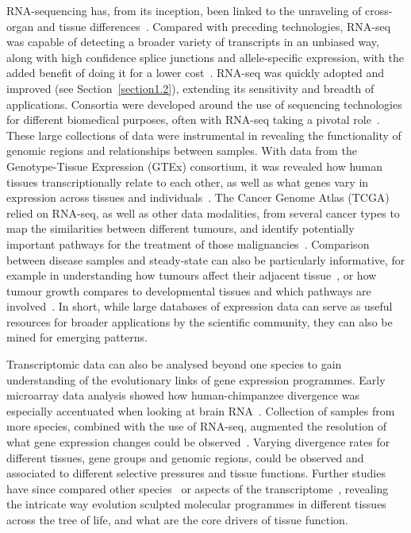 RNA-sequencing has, from its inception, been linked to the unraveling of cross-organ and tissue differences~\citep{mortazavi_mapping_2008}. Compared with preceding technologies, RNA-seq was capable of detecting a broader variety of transcripts in an unbiased way, along with high confidence splice junctions and allele-specific expression, with the added benefit of doing it for a lower cost~\citep{wang_rna-seq:_2009}. RNA-seq was quickly adopted and improved (see Section~\ref{section1.2}), extending its sensitivity and breadth of applications. Consortia were developed around the use of sequencing technologies for different biomedical purposes, often with RNA-seq taking a pivotal role~\citep{the_cancer_genome_atlas_research_network_cancer_2013,the_encode_project_consortium_integrated_2012,lonsdale_genotype-tissue_2013}. These large collections of data were instrumental in revealing the functionality of genomic regions and relationships between samples. With data from the Genotype-Tissue Expression (GTEx) consortium, it was revealed how human tissues transcriptionally relate to each other, as well as what genes vary in expression across tissues and individuals~\citep{mele_human_2015}. The Cancer Genome Atlas (TCGA) relied on RNA-seq, as well as other data modalities, from several cancer types to map the similarities between different tumours, and identify potentially important pathways for the treatment of those malignancies~\citep{hoadley_cell--origin_2018}. Comparison between disease samples and steady-state can also be particularly informative, for example in understanding how tumours affect their adjacent tissue~\citep{aran_comprehensive_2017}, or how tumour growth compares to developmental tissues and which pathways are involved~\citep{young_single-cell_2018}. In short, while large databases of expression data can serve as useful resources for broader applications by the scientific community, they can also be mined for emerging patterns.

Transcriptomic data can also be analysed beyond one species to gain understanding of the evolutionary links of gene expression programmes. Early microarray data analysis showed how human-chimpanzee divergence was especially accentuated when looking at brain RNA~\citep{enard_intra-_2002}. Collection of samples from more species, combined with the use of RNA-seq, augmented the resolution of what gene expression changes could be observed~\citep{brawand_evolution_2011}. Varying divergence rates for different tissues, gene groups and genomic regions, could be observed and associated to different selective pressures and tissue functions. Further studies have since compared other species~\citep{li_comparison_2014} or aspects of the transcriptome~\citep{barbosa-morais_evolutionary_2012}, revealing the intricate way evolution sculpted molecular programmes in different tissues across the tree of life, and what are the core drivers of tissue function. 

